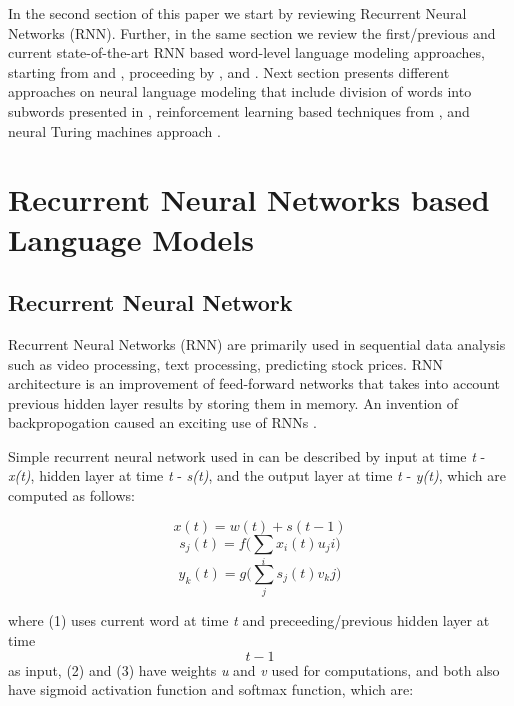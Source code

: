 \documentclass{IEEEtran}
\begin{document}
In the second section of this paper we start by reviewing Recurrent Neural Networks (RNN). Further, in the same section we review the first/previous and current state-of-the-art RNN based word-level language modeling approaches, starting from \cite{Mikolov2010NeuralLM} and \cite{Mikolov2011ExtensionsOR}, proceeding by \cite{Zaremba2014LSTM}, and \cite{Salakhutdinov2017Softmax}. Next section presents different approaches on neural language modeling that include division of words into subwords presented in \cite{Mikolov2011SubwordLM}, reinforcement learning based techniques from \cite{}, and neural Turing machines approach \cite{}.

\section{Recurrent Neural Networks based Language Models}

\subsection{Recurrent Neural Network}

Recurrent Neural Networks (RNN) are primarily used in sequential data analysis such as video processing, text processing, predicting stock prices. RNN architecture is an improvement of feed-forward networks that takes into account previous hidden layer results by storing them in memory. An invention of backpropogation caused an exciting use of RNNs \cite{deeplearning}.

Simple recurrent neural network used in \cite{Mikolov2010NeuralLM} can be described by input at time \textit{t} - \textit{x(t)}, hidden layer at time \textit{t} - \textit{s(t)}, and the output layer at time \textit{t} - \textit{y(t)}, which are computed as follows:

\begin{equation}
x(t) = w(t) + s(t-1)
\end{equation}
\begin{equation}
s_j(t) = f\Bigg(\sum_i{x_i(t)u_ji}\Bigg)
\end{equation}
\begin{equation}
y_k(t) = g\Bigg(\sum_j{s_j(t) v_kj}\Bigg)
\end{equation}

where (1) uses current word at time \textit{t} and preceeding/previous hidden layer at time \[t-1\] as input, (2) and (3) have weights \textit{u} and \textit{v} used for computations, and both also have sigmoid activation function and softmax function, which are:
\end{document}
